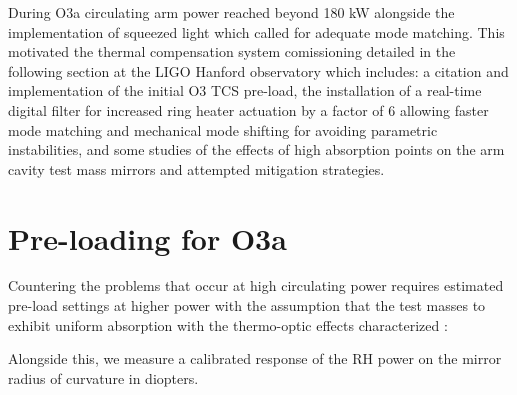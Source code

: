




During O3a circulating arm power reached beyond 180 kW alongside the implementation of squeezed light which called for adequate mode matching. This motivated the thermal compensation system comissioning detailed in the following section at the LIGO Hanford observatory which includes: a citation and implementation of the initial O3 TCS pre-load, the installation of a real-time digital filter for increased ring heater actuation by a factor of 6 allowing faster mode matching and mechanical mode shifting for avoiding parametric instabilities, and some studies of the effects of high absorption points on the arm cavity test mass mirrors and attempted mitigation strategies. 

\section{Pre-loading for O3a}
Countering the problems that occur at high circulating power requires estimated pre-load settings at higher power with the assumption that the test masses to exhibit uniform absorption with the thermo-optic effects characterized \cite{}: 



Alongside this, we measure a calibrated response of the RH power on the mirror radius of curvature in diopters. 

